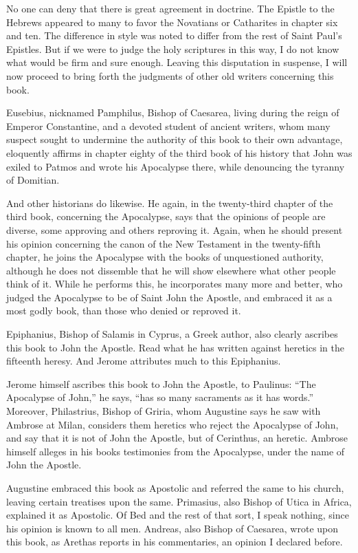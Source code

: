 No one can deny that there is great agreement in doctrine. The Epistle to the Hebrews appeared to many to favor the Novatians or Catharites in chapter six and ten. The difference in style was noted to differ from the rest of Saint Paul’s Epistles. But if we were to judge the holy scriptures in this way, I do not know what would be firm and sure enough. Leaving this disputation in suspense, I will now proceed to bring forth the judgments of other old writers concerning this book.

Eusebius, nicknamed Pamphilus, Bishop of Caesarea, living during the reign of Emperor Constantine, and a devoted student of ancient writers, whom many suspect sought to undermine the authority of this book to their own advantage, eloquently affirms in chapter eighty of the third book of his history that John was exiled to Patmos and wrote his Apocalypse there, while denouncing the tyranny of Domitian.

And other historians do likewise. He again, in the twenty-third chapter of the third book, concerning the Apocalypse, says that the opinions of people are diverse, some approving and others reproving it. Again, when he should present his opinion concerning the canon of the New Testament in the twenty-fifth chapter, he joins the Apocalypse with the books of unquestioned authority, although he does not dissemble that he will show elsewhere what other people think of it. While he performs this, he incorporates many more and better, who judged the Apocalypse to be of Saint John the Apostle, and embraced it as a most godly book, than those who denied or reproved it.

Epiphanius, Bishop of Salamis in Cyprus, a Greek author, also clearly ascribes this book to John the Apostle. Read what he has written against heretics in the fifteenth heresy. And Jerome attributes much to this Epiphanius.

Jerome himself ascribes this book to John the Apostle, to Paulinus: “The Apocalypse of John,” he says, “has so many sacraments as it has words.” Moreover, Philastrius, Bishop of Griria, whom Augustine says he saw with Ambrose at Milan, considers them heretics who reject the Apocalypse of John, and say that it is not of John the Apostle, but of Cerinthus, an heretic. Ambrose himself alleges in his books testimonies from the Apocalypse, under the name of John the Apostle.

Augustine embraced this book as Apostolic and referred the same to his church, leaving certain treatises upon the same. Primasius, also Bishop of Utica in Africa, explained it as Apostolic. Of Bed and the rest of that sort, I speak nothing, since his opinion is known to all men. Andreas, also Bishop of Caesarea, wrote upon this book, as Arethas reports in his commentaries, an opinion I declared before.

